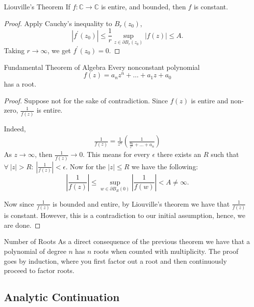 \documentclass{article}
\begin{document}
\begin{thrm}{Liouville's Theorem}{}
If \( f: \mathbb{C} \to \mathbb{C}  \) is entire, and bounded, then \( f \) is constant.
\tcbline
\begin{proof}
Apply Cauchy's inequality to \( B_r(z_0) \),
\[
    \left\lvert f^\prime (z_0) \right\rvert\leq \frac{1}{r} \sup _{z \in \partial B_r(z_0)} \left\lvert f(z) \right\rvert  \leq A.
\]
Taking \( r \to \infty  \), we get \( f^\prime (z_0) = 0 \). 
\end{proof}

\end{thrm}


\begin{thrm}{Fundamental Theorem of Algebra}{}
Every nonconstant polynomial
\[
    f(z) = a_{n} z^n + \dots + a_{1}z + a_0 
\]
has a root. 

\tcbline

\begin{proof}
Suppose not for the sake of contradiction. Since \( f(z) \) is entire and non-zero, \( \frac{1}{f(z)} \) is entire.  

 Indeed, 
\begin{align*}
    \frac{1}{f(z)} = \frac{1}{z^n} \left( \frac{1}{\frac{a_0}{z^n} + \dots + a_{n} } \right) 
\end{align*}
As \( z \to  \infty  \), then \( \frac{1}{f(z)} \to 0 \). This means for every \( \epsilon   \)  there exists an \( R \) such that \( \forall \ |z|>R: \  \left\lvert \frac{1}{f(z)} \right\rvert  < \epsilon  \). Now for the \( |z| \leq R \)  we have the following:
\[
    \left\lvert \frac{1}{f(z)} \right\rvert  \leq  \sup _{w \in \partial B_R(0)} |\frac{1}{f(w)}| < A \neq \infty .
\]

Now since \( \frac{1}{f(z)} \) is bounded and entire, by Liouville's theorem we have that \( \frac{1}{f(z)} \) is constant. However, this is a contradiction to our initial assumption, hence, we are done. 
\end{proof}

\end{thrm}
\begin{cor}{Number of Roots}{}
As a direct consequence of the previous theorem we have that a polynomial of degree \( n \) has \( n \) roots when counted with multiplicity. The proof goes by induction, where you first factor out a root and then continuously proceed to factor roots. 
\end{cor}

\subsection{Analytic Continuation}
\end{document}
